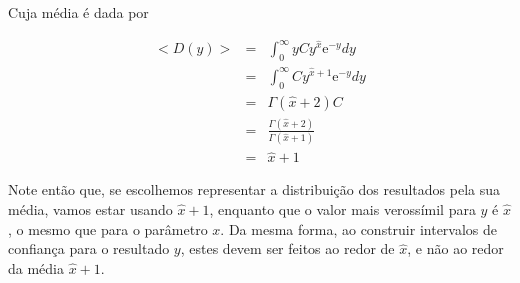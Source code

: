 Cuja m\'edia \'e dada por

\begin{eqnarray*}
	<D(y)> & = & \int_0^\infty y C y^{\hat x} \mathrm{e}^{-y} dy \\
	       & = & \int_0^\infty C y^{\hat x+1} \mathrm{e}^{-y} dy \\
		   & = & \Gamma(\hat x +2) C\\
	       & = & \frac{\Gamma(\hat x +2)}{\Gamma(\hat x + 1)} \\
		   & = & \hat x + 1
\end{eqnarray*}

Note ent\~ao que, se escolhemos representar a distribui\c c\~ao dos resultados pela sua m\'edia,
vamos estar usando $\hat x + 1$, enquanto que o valor mais verossímil para $y$ \'e $\hat x$, o mesmo
que para o par\^ametro $x$. Da mesma forma, ao construir intervalos de confian\c ca para o resultado
$y$, estes devem ser feitos ao redor de $\hat x$, e n\~ao ao redor da m\'edia $\hat x + 1$. 
